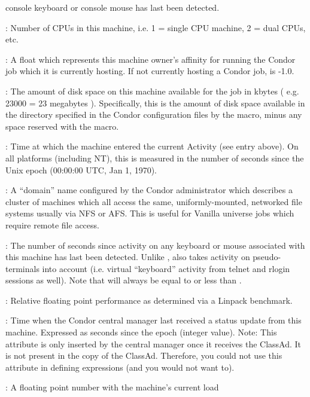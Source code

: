 \begin{description}
console keyboard or console mouse has last been detected.
%
\item[\AdAttr{Cpus}] : Number of CPUs in this machine, i.e. 1 = single CPU machine, 2 = dual
CPUs, etc.
%
\item[\AdAttr{CurrentRank}] : A float which represents this machine owner's affinity
for running the Condor job which it is currently hosting.  If not
currently hosting a Condor job,  is -1.0.
%
\item[\AdAttr{Disk}] : The amount of disk space on this machine available for
the job in kbytes ( e.g. 23000 = 23 megabytes ).  Specifically, this
is the amount of disk space available in the directory specified in
the Condor configuration files by the  macro, minus any
space reserved with the  macro.
%
\item[\AdAttr{EnteredCurrentActivity}] : Time at which the machine
entered the current Activity (see  entry above).  On
all platforms (including NT), this is measured in the number of
seconds since the Unix epoch (00:00:00 UTC, Jan 1, 1970).
%
\item[\AdAttr{FileSystemDomain}] : A ``domain'' name configured by the
Condor administrator which describes a cluster of machines which all
access the same, uniformly-mounted, networked file systems usually via
NFS or AFS.  This is useful for Vanilla universe jobs which require
remote file access.
%
\item[\AdAttr{KeyboardIdle}] : The number of seconds since activity on any
keyboard or mouse associated with this machine has last been detected.
Unlike ,  also takes activity 
on pseudo-terminals into
account (i.e. virtual ``keyboard'' activity from telnet and rlogin
sessions as well).  Note that  will always be equal to or
less than .
%
\item[\AdAttr{KFlops}] : Relative floating point performance as determined via a
Linpack benchmark.
%
\item[\AdAttr{LastHeardFrom}] : Time when the Condor central manager last
received a status update from this machine.  
Expressed as seconds since the epoch (integer value).
Note: This attribute is only inserted by the central manager once it
receives the ClassAd.
It is not present in the  copy of the ClassAd.
Therefore, you could not use this attribute in defining 
expressions (and you would not want to).
%
\item[\AdAttr{LoadAvg}] : A floating point number with the machine's current load

\end{description}
